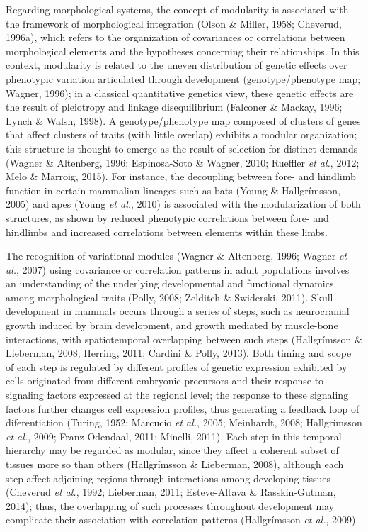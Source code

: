 \documentclass[12pt,twoside]{report}
\begin{document}
Regarding morphological systems, the concept of modularity is associated
with the framework of morphological integration (Olson \& Miller, 1958;
Cheverud, 1996a), which refers to the organization of covariances or
correlations between morphological elements and the hypotheses
concerning their relationships. In this context, modularity is related
to the uneven distribution of genetic effects over phenotypic variation
articulated through development (genotype/phenotype map; Wagner, 1996);
in a classical quantitative genetics view, these genetic effects are the
result of pleiotropy and linkage disequilibrium (Falconer \& Mackay,
1996; Lynch \& Walsh, 1998). A genotype/phenotype map composed of
clusters of genes that affect clusters of traits (with little overlap)
exhibits a modular organization; this structure is thought to emerge as
the result of selection for distinct demands (Wagner \& Altenberg, 1996;
Espinosa-Soto \& Wagner, 2010; Rueffler \emph{et al.}, 2012; Melo \&
Marroig, 2015). For instance, the decoupling between fore- and hindlimb
function in certain mammalian lineages such as bats (Young \&
Hallgrímsson, 2005) and apes (Young \emph{et al.}, 2010) is associated
with the modularization of both structures, as shown by reduced
phenotypic correlations between fore- and hindlimbs and increased
correlations between elements within these limbs.

The recognition of variational modules (Wagner \& Altenberg, 1996;
Wagner \emph{et al.}, 2007) using covariance or correlation patterns in
adult populations involves an understanding of the underlying
developmental and functional dynamics among morphological traits (Polly,
2008; Zelditch \& Swiderski, 2011). Skull development in mammals occurs
through a series of steps, such as neurocranial growth induced by brain
development, and growth mediated by muscle-bone interactions, with
spatiotemporal overlapping between such steps (Hallgrímsson \&
Lieberman, 2008; Herring, 2011; Cardini \& Polly, 2013). Both timing and
scope of each step is regulated by different profiles of genetic
expression exhibited by cells originated from different embryonic
precursors and their response to signaling factors expressed at the
regional level; the response to these signaling factors further changes
cell expression profiles, thus generating a feedback loop of
diferentiation (Turing, 1952; Marcucio \emph{et al.}, 2005; Meinhardt,
2008; Hallgrímsson \emph{et al.}, 2009; Franz-Odendaal, 2011; Minelli,
2011). Each step in this temporal hierarchy may be regarded as modular,
since they affect a coherent subset of tissues more so than others
(Hallgrímsson \& Lieberman, 2008), although each step affect adjoining
regions through interactions among developing tissues (Cheverud \emph{et
al.}, 1992; Lieberman, 2011; Esteve-Altava \& Rasskin-Gutman, 2014);
thus, the overlapping of such processes throughout development may
complicate their association with correlation patterns (Hallgrímsson
\emph{et al.}, 2009).
\end{document}
